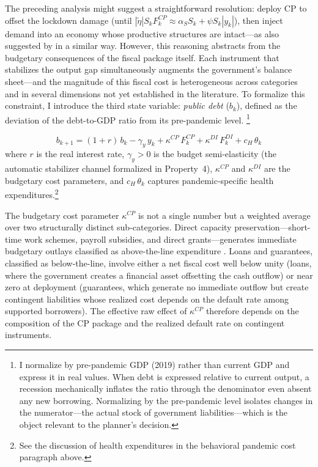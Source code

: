 The preceding analysis might suggest a straightforward resolution: deploy CP to offset the lockdown damage (until $|\tilde{\eta}| S_k F_k^{CP} \approx \alpha_S S_k + \psi S_k |y_k|$), then inject demand into an economy whose productive structures are intact---as also suggested by \citet{deb2021} in a similar way. However, this reasoning abstracts from the budgetary consequences of the fiscal package itself. Each instrument that stabilizes the output gap simultaneously augments the government's balance sheet---and the magnitude of this fiscal cost is heterogeneous across categories and in several dimensions not yet established in the literature. To formalize this constraint, I introduce the third state variable: \textit{public debt} ($b_k$), defined as the deviation of the debt-to-GDP ratio from its pre-pandemic level. \footnote{I normalize by pre-pandemic GDP (2019) rather than current GDP and express it in real values. When debt is expressed relative to current output, a recession mechanically inflates the ratio through the denominator even absent any new borrowing. Normalizing by the pre-pandemic level isolates changes in the numerator---the actual stock of government liabilities---which is the object relevant to the planner's decision.}

%
\begin{equation}
    b_{k+1} = (1+r)\, b_k - \gamma_y\, y_k + \kappa^{CP}\, F^{CP}_k + \kappa^{DI}\, F^{DI}_k + c_H\, \theta_k
    \label{eq:debt}
\end{equation}
%
where $r$ is the real interest rate, $\gamma_y > 0$ is the budget semi-elasticity (the automatic stabilizer channel formalized in Property~4), $\kappa^{CP}$ and $\kappa^{DI}$ are the budgetary cost parameters, and $c_H\, \theta_k$ captures pandemic-specific health expenditures.\footnote{See the discussion of health expenditures 
in the behavioral pandemic cost paragraph above.}

The budgetary cost parameter $\kappa^{CP}$ is not a single number but a weighted average over two structurally distinct sub-categories. Direct capacity preservation---short-time work schemes, payroll subsidies, and direct grants---generates immediate budgetary outlays classified as above-the-line expenditure \citep{imf2022fiscalmonitor}. Loans and guarantees, classified as below-the-line, involve either a net fiscal cost well below unity (loans, where the government creates a financial asset offsetting the cash outflow) or near zero at deployment (guarantees, which generate no immediate outflow but create contingent liabilities whose realized cost depends on the default rate among supported borrowers). The effective raw effect of $\kappa^{CP}$ therefore depends on the composition of the CP package and the realized default rate on contingent instruments.

